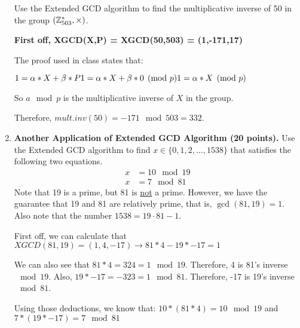 \documentclass[11pt]{article}
\begin{document}
\begin{enumerate}
   Use the Extended GCD algorithm to find the multiplicative inverse of 50 in the group $({\mathbb Z}_{503}^*,\times)$.
   
  {\bfseries 
  First off, \newline
  XGCD(X,P) = XGCD(50,503) = (1,-171,17) \newline

  The proof used in class states that:

  $1 = \alpha * X + \beta * P \newline
  1 = \alpha * X + \beta * 0 \pmod p \newline
  1 = \alpha * X \pmod p \newline
  $

  So $a\mod p$ is the multiplicative inverse of $X$ in the group. \newline

  Therefore, $mult.inv(50) = -171 \mod 503 = 332$.
  }
  
  
 \newpage 



\item {\bfseries Another Application of Extended GCD Algorithm (20 points).} 
Use the Extended GCD algorithm to find $x \in \{0,1,2,\dots, 1538\}$ that satisfies the following two equations. 
\begin{align*}
    x &= 10\mod 19\\
    x &= 7 \mod 81
\end{align*}
Note that 19 is a prime, but 81 is \ul{not} a prime. 
However, we have the guarantee that 19 and 81 are relatively prime, that is, $\gcd(81,19)=1$. 
Also note that the number $1538 = 19\cdot81-1$. 
  {\bfseries 
  \newline

  First off, we can calculate that $XGCD(81,19) = (1,4,-17) \rightarrow 81*4 - 19*-17 = 1$ \newline

  We can also see that $81*4 = 324 = 1\mod 19$. Therefore, 4 is 81's inverse$\mod 19$. \newline
  Also, $19*-17 = -323 = 1\mod 81$. Therefore, -17 is 19's inverse$\mod 81$. \newline

  Using those deductions, we know that: \newline
  $10 * (81*4) = 10\mod 19$ \newline
  and \newline
  $7 * (19*-17) = 7\mod 81$ \newline

}
\end{enumerate}
\end{document}
